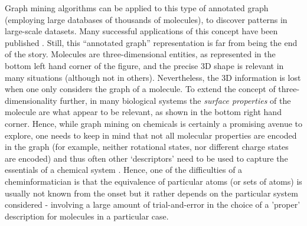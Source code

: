 \documentclass{sig-alternate}
\begin{document}

Graph mining algorithms can be applied to this type of annotated graph
(employing large databases of thousands of molecules), to discover
patterns in large-scale datasets.  Many successful applications of
this concept have been published \cite{wegner2006,horst2009}. Still,
this ``annotated graph'' representation is far from being the end of
the story. Molecules are three-dimensional entities, as represented in
the bottom left hand corner of the figure, and the precise 3D shape is
relevant in many situations (although not in others).  Nevertheless, the
3D information is lost when one only considers the graph of a
molecule. To extend the concept of three-dimensionality further, in
many biological systems the \emph{surface properties} of the molecule
are what appear to be relevant, as shown in the bottom right hand
corner.  Hence, while graph mining on chemicals is certainly a
promising avenue to explore, one needs to keep in mind that not all
molecular properties are encoded in the graph (for example, neither
rotational states, nor different charge states are encoded) and thus
often other `descriptors' need to be used to capture the essentials of
a chemical system \cite{bender2004}. Hence, one of the difficulties of a cheminformatician is that the equivalence of particular atoms (or sets of atoms) is usually not known from the onset but it rather depends on the particular system considered - involving a large amount of trial-and-error in the choice of a 'proper' description for molecules in a particular case.
\end{document}
